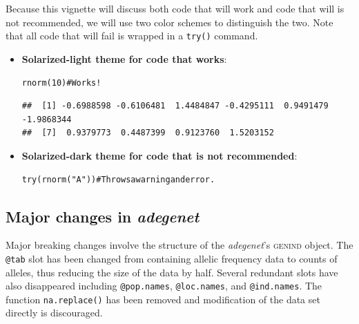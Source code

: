 \documentclass[letterpaper]{article}\usepackage[]{graphicx}\usepackage[]{color}
\makeatletter
\newcommand{\hlnum}[1]{\textcolor[rgb]{0.863,0.196,0.184}{#1}}%
\newcommand{\hlstr}[1]{\textcolor[rgb]{0.863,0.196,0.184}{#1}}%
\newcommand{\hlcom}[1]{\textcolor[rgb]{0.576,0.631,0.631}{#1}}%
\newcommand{\hlstd}[1]{\textcolor[rgb]{0.396,0.482,0.514}{#1}}%
\newcommand{\hlkwd}[1]{\textcolor[rgb]{0.345,0.431,0.459}{#1}}%
\newenvironment{kframe}{%
 \def\at@end@of@kframe{}%
 \ifinner\ifhmode%
  \def\at@end@of@kframe{\end{minipage}}%
  \begin{minipage}{\columnwidth}%
 \fi\fi%
 \def\FrameCommand##1{\hskip\@totalleftmargin \hskip-\fboxsep
 \colorbox{shadecolor}{##1}\hskip-\fboxsep
     \hskip-\linewidth \hskip-\@totalleftmargin \hskip\columnwidth}%
 \MakeFramed {\advance\hsize-\width
   \@totalleftmargin\z@ \linewidth\hsize
   \@setminipage}}%
 {\par\unskip\endMakeFramed%
 \at@end@of@kframe}
\newenvironment{knitrout}{}{} %
\newcommand{\adegenet}{\textit{adegenet}}
\makeatother
\begin{document}
Because this vignette will discuss both code that will work and code that will
is not recommended, we will use two color schemes to distinguish the two. Note
that all code that will fail is wrapped in a \texttt{try()} command.
\begin{itemize}
\item \textbf{Solarized-light theme for code that works}:
\begin{knitrout}
\color{fgcolor}\begin{kframe}
\begin{alltt}
\hlkwd{rnorm}\hlstd{(}\hlnum{10}\hlstd{)} \hlcom{# Works!}
\end{alltt}
\begin{verbatim}
##  [1] -0.6988598 -0.6106481  1.4484847 -0.4295111  0.9491479 -1.9868344
##  [7]  0.9379773  0.4487399  0.9123760  1.5203152
\end{verbatim}
\end{kframe}
\end{knitrout}



\item \textbf{Solarized-dark theme for code that is not recommended}:
\begin{knitrout}
\color{fgcolor}\begin{kframe}
\begin{alltt}
\hlkwd{try}\hlstd{(}\hlkwd{rnorm}\hlstd{(}\hlstr{"A"}\hlstd{))} \hlcom{# Throws a warning and error.}
\end{alltt}


{\ttfamily\noindent{}}\end{kframe}
\end{knitrout}


\end{itemize}
\subsection{Major changes in \adegenet{}}

Major breaking changes involve the structure of the \adegenet{}'s \textsc{genind}
object. The \texttt{@tab} slot has been changed from containing allelic frequency
data to counts of alleles, thus reducing the size of the data by half. Several
redundant slots have also disappeared including \texttt{@pop.names}, 
\texttt{@loc.names}, and \texttt{@ind.names}. The function \texttt{na.replace()}
has been removed and modification of the data set directly is discouraged. 
\end{document}
